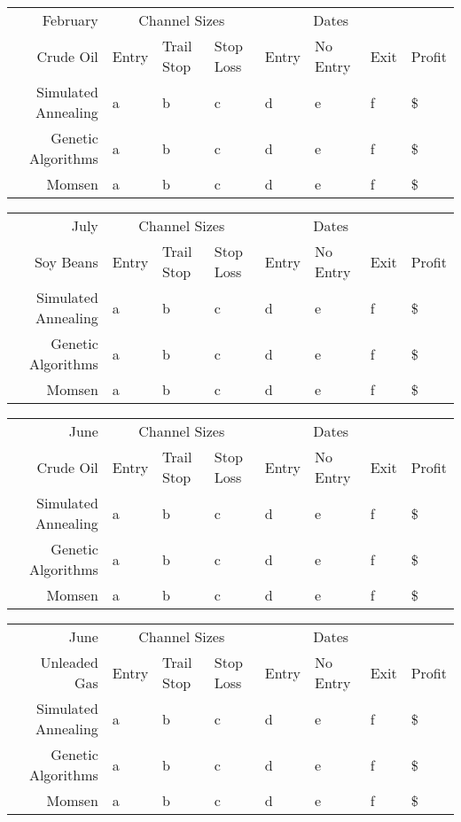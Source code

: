\documentclass[10pt]{article}
\begin{document}
\begin{tabular}{|r|l|l|l|l|l|l|l|}
  \hline
  February & \multicolumn{3}{|c|}{Channel Sizes} & \multicolumn{3}{|c|}{Dates} &  \\
  Crude Oil & Entry & Trail Stop & Stop Loss & Entry & No Entry & Exit & Profit\\ \hline
  Simulated Annealing & a & b & c & d & e & f & \$ \\ \hline
  Genetic Algorithms & a & b & c & d & e & f & \$ \\ \hline
  Momsen &  a & b & c & d & e & f & \$ \\ \hline
\end{tabular}

\begin{tabular}{|r|l|l|l|l|l|l|l|}
  \hline
  July & \multicolumn{3}{|c|}{Channel Sizes} & \multicolumn{3}{|c|}{Dates} &  \\
  Soy Beans & Entry & Trail Stop & Stop Loss & Entry & No Entry & Exit & Profit\\ \hline
  Simulated Annealing & a & b & c & d & e & f & \$ \\ \hline
  Genetic Algorithms & a & b & c & d & e & f & \$ \\ \hline
  Momsen &  a & b & c & d & e & f & \$ \\ \hline
\end{tabular}

\begin{tabular}{|r|l|l|l|l|l|l|l|}
  \hline
  June & \multicolumn{3}{|c|}{Channel Sizes} & \multicolumn{3}{|c|}{Dates} &  \\
  Crude Oil & Entry & Trail Stop & Stop Loss & Entry & No Entry & Exit & Profit\\ \hline
  Simulated Annealing & a & b & c & d & e & f & \$ \\ \hline
  Genetic Algorithms & a & b & c & d & e & f & \$ \\ \hline
  Momsen &  a & b & c & d & e & f & \$ \\ \hline
\end{tabular}

\begin{tabular}{|r|l|l|l|l|l|l|l|}
  \hline
  June & \multicolumn{3}{|c|}{Channel Sizes} & \multicolumn{3}{|c|}{Dates} &  \\
  Unleaded Gas & Entry & Trail Stop & Stop Loss & Entry & No Entry & Exit & Profit\\ \hline
  Simulated Annealing & a & b & c & d & e & f & \$ \\ \hline
  Genetic Algorithms & a & b & c & d & e & f & \$ \\ \hline
  Momsen &  a & b & c & d & e & f & \$ \\ \hline
\end{tabular}
\end{document}
